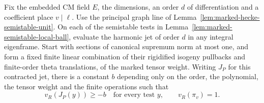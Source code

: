 \begin{auxlemma}
\label{lem:marked-bounded-jet-frame}
Fix the embedded CM field \(E\), the dimensions, an order \(d\)
of differentiation and a coefficient place \(v\mid\ell\). Use the
principal graph line of Lemma~\ref{lem:marked-hecke-semistable-unit}.
On each of the semistable tests in
Lemma~\ref{lem:marked-semistable-local-ball}, evaluate the harmonic
jet of order \(d\) in any integral eigenframe. Start with sections
of canonical supremum norm at most one, and form a fixed finite
linear combination of their rigidified isogeny pullbacks and
finite-order theta translations, of the marked tensor weight.
Writing \(J_P\) for this contracted jet, there is a constant \(b\)
depending only on the order, the polynomial, the tensor weight and
the finite operations such that
\[
             v_R(J_P(y))\ge-b\quad\text{for every test }y,
                         \qquad v_R(\pi_v)=1 .
\]
\end{auxlemma}
